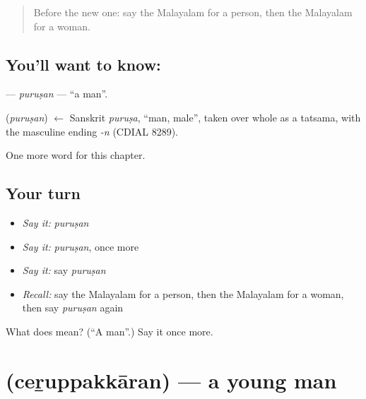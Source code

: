 \label{lesson:ML-C325-purusan}



\begin{quote}
Before the new one: say the Malayalam for a person, then the Malayalam for a woman.
\end{quote}

\subsection*{You'll want to know: }
\textbf{} — \emph{puruṣan} — \textquotedblleft{}a man\textquotedblright{}.

\begin{cousinweb}
\textbf{} (\emph{puruṣan}) $\leftarrow$ Sanskrit \emph{puruṣa}, \textquotedblleft{}man, male\textquotedblright{}, taken over whole as a tatsama, with the masculine ending \emph{-n} (CDIAL 8289).
\end{cousinweb}

\begin{grammarlens}[title={What you've built}]
One more word for this chapter.
\end{grammarlens}

\subsection*{Your turn}
\begin{itemize}
\raggedright
  \item \emph{Say it:} \emph{puruṣan}
  \item \emph{Say it:} \emph{puruṣan}, once more
  \item \emph{Say it:} say \emph{puruṣan}
  \item \emph{Recall:} say the Malayalam for a person, then the Malayalam for a woman, then say \emph{puruṣan} again
\end{itemize}

\begin{tcolorbox}[breakable,colback=teal!4,colframe=teal!35!black,title={Before you move on}]
What does  mean? (\textquotedblleft{}A man\textquotedblright{}.) Say it once more.
\end{tcolorbox}
\section[\texorpdfstring{\ml{ചെറുപ്പക്കാരൻ} (ceṟuppakkāran)}{ചെറുപ്പക്കാരൻ (ceṟuppakkāran)}]{ (ceṟuppakkāran) — a young man}

